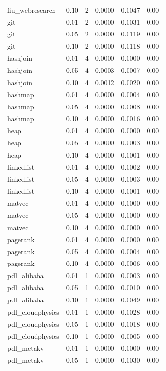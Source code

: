 \begin{tabular}{lcrrrr}
fiu\_webresearch & 0.10 & 2 & 0.0000 & 0.0047 & 0.00 \\
git & 0.01 & 2 & 0.0000 & 0.0031 & 0.00 \\
git & 0.05 & 2 & 0.0000 & 0.0119 & 0.00 \\
git & 0.10 & 2 & 0.0000 & 0.0118 & 0.00 \\
hashjoin & 0.01 & 4 & 0.0000 & 0.0000 & 0.00 \\
hashjoin & 0.05 & 4 & 0.0003 & 0.0007 & 0.00 \\
hashjoin & 0.10 & 4 & 0.0012 & 0.0020 & 0.00 \\
hashmap & 0.01 & 4 & 0.0000 & 0.0004 & 0.00 \\
hashmap & 0.05 & 4 & 0.0000 & 0.0008 & 0.00 \\
hashmap & 0.10 & 4 & 0.0000 & 0.0016 & 0.00 \\
heap & 0.01 & 4 & 0.0000 & 0.0000 & 0.00 \\
heap & 0.05 & 4 & 0.0000 & 0.0003 & 0.00 \\
heap & 0.10 & 4 & 0.0000 & 0.0001 & 0.00 \\
linkedlist & 0.01 & 4 & 0.0000 & 0.0002 & 0.00 \\
linkedlist & 0.05 & 4 & 0.0000 & 0.0003 & 0.00 \\
linkedlist & 0.10 & 4 & 0.0000 & 0.0001 & 0.00 \\
matvec & 0.01 & 4 & 0.0000 & 0.0000 & 0.00 \\
matvec & 0.05 & 4 & 0.0000 & 0.0000 & 0.00 \\
matvec & 0.10 & 4 & 0.0000 & 0.0000 & 0.00 \\
pagerank & 0.01 & 4 & 0.0000 & 0.0000 & 0.00 \\
pagerank & 0.05 & 4 & 0.0000 & 0.0004 & 0.00 \\
pagerank & 0.10 & 4 & 0.0000 & 0.0006 & 0.00 \\
pdl\_alibaba & 0.01 & 1 & 0.0000 & 0.0003 & 0.00 \\
pdl\_alibaba & 0.05 & 1 & 0.0000 & 0.0010 & 0.00 \\
pdl\_alibaba & 0.10 & 1 & 0.0000 & 0.0049 & 0.00 \\
pdl\_cloudphysics & 0.01 & 1 & 0.0000 & 0.0028 & 0.00 \\
pdl\_cloudphysics & 0.05 & 1 & 0.0000 & 0.0018 & 0.00 \\
pdl\_cloudphysics & 0.10 & 1 & 0.0000 & 0.0005 & 0.00 \\
pdl\_metakv & 0.01 & 1 & 0.0000 & 0.0000 & 0.00 \\
pdl\_metakv & 0.05 & 1 & 0.0000 & 0.0030 & 0.00 \\

\end{tabular}
